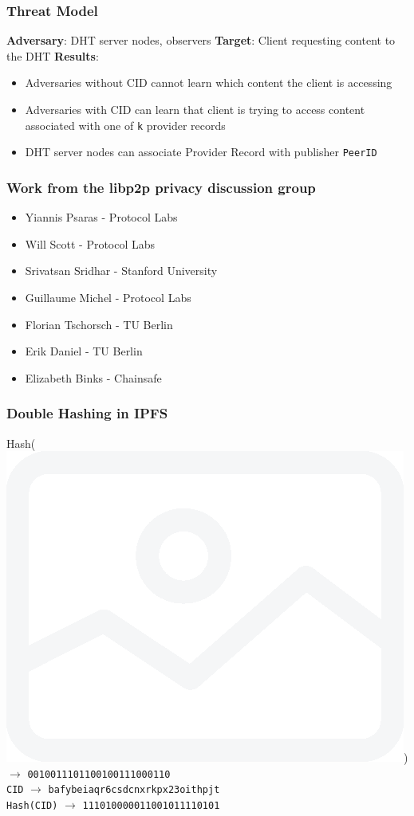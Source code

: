 \documentclass{pl-slide}
\begin{document}
\begin{frame}
\frametitle{Threat Model}
\begin{itemize}
	\itemc \textbf{Adversary}: DHT server nodes, observers
	\itemc \textbf{Target}: Client requesting content to the DHT
	\itemc \textbf{Results}:
	\begin{itemize}
		\item[\greencube] Adversaries without CID cannot learn which content the client is accessing
		\item[\greencube] Adversaries with CID can learn that client is trying to access content associated with one of \texttt{k} provider records
		\item[\greencube] DHT server nodes can associate Provider Record with publisher \texttt{PeerID}
	\end{itemize}
\end{itemize}
\end{frame}


\iffalse
\begin{frame}
\frametitle{Work from the libp2p privacy discussion group}
\begin{itemize}
	\item Yiannis Psaras - Protocol Labs
	\item Will Scott - Protocol Labs
	\item Srivatsan Sridhar - Stanford University
	\item Guillaume Michel - Protocol Labs
	\item Florian Tschorsch - TU Berlin
	\item Erik Daniel - TU Berlin
	\item Elizabeth Binks - Chainsafe
\end{itemize}
\end{frame}

\begin{frame}
\frametitle{Double Hashing in IPFS}

{\huge
Hash(\includegraphics[scale=0.06]{resources/image.png}) $\rightarrow$ \texttt{0010011101100100111000110}\\
\bigskip
\texttt{CID} $\rightarrow$ \texttt{bafybeiaqr6csdcnxrkpx23oithpjt}\\
\bigskip
\texttt{Hash(CID)} $\rightarrow$ \texttt{111010000011001011110101}
}
\end{frame}
\end{document}
